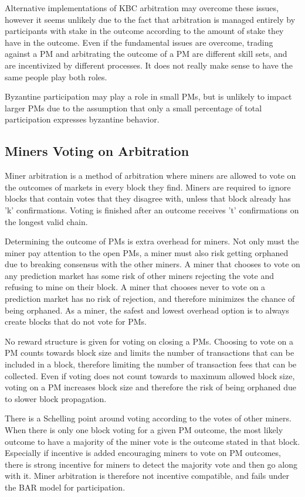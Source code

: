 \documentclass[onecolumn]{article}
\begin{document}
Alternative implementations of KBC arbitration may overcome these issues, however it seems unlikely due to the fact that arbitration is managed entirely by participants with stake in the outcome according to the amount of stake they have in the outcome.
Even if the fundamental issues are overcome, trading against a PM and arbitrating the outcome of a PM are different skill sets, and are incentivized by different processes.
It does not really make sense to have the same people play both roles.

Byzantine participation may play a role in small PMs, but is unlikely to impact larger PMs due to the assumption that only a small percentage of total participation expresses byzantine behavior.

\subsection{Miners Voting on Arbitration}
Miner arbitration \cite{pmob} is a method of arbitration where miners are allowed to vote on the outcomes of markets in every block they find.
Miners are required to ignore blocks that contain votes that they disagree with, unless that block already has 'k' confirmations.
Voting is finished after an outcome receives 't' confirmations on the longest valid chain.

Determining the outcome of PMs is extra overhead for miners.
Not only must the miner pay attention to the open PMs, a miner must also risk getting orphaned due to breaking consensus with the other miners.
A miner that chooses to vote on any prediction market has some risk of other miners rejecting the vote and refusing to mine on their block.
A miner that chooses never to vote on a prediction market has no risk of rejection, and therefore minimizes the chance of being orphaned.
As a miner, the safest and lowest overhead option is to always create blocks that do not vote for PMs.

No reward structure is given for voting on closing a PMs.
Choosing to vote on a PM counts towards block size and limits the number of transactions that can be included in a block, therefore limiting the number of transaction fees that can be collected.
Even if voting does not count towards to maximum allowed block size, voting on a PM increases block size and therefore the risk of being orphaned due to slower block propagation.

There is a Schelling point \cite{focal} \cite{focal-wiki} around voting according to the votes of other miners.
When there is only one block voting for a given PM outcome, the most likely outcome to have a majority of the miner vote is the outcome stated in that block.
Especially if incentive is added encouraging miners to vote on PM outcomes, there is strong incentive for miners to detect the majority vote and then go along with it.
Miner arbitration is therefore not incentive compatible, and fails under the BAR model for participation.
\end{document}
